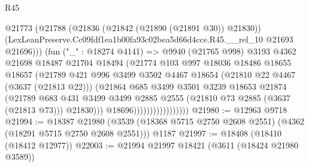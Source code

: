 \begin{lexlean}{R45}
\begin{coremodule}
                                  @21773
                                    (@21788
                                      (@21836 (@21842 (@21890 (@21891 @30)) @21830))
                                      (LexLeanPreserve.Cc09fdf1ea1b00fa93c02bea5d66d4cce.R45.__rel_10
                                        @21693
                                        @21696)))
                                  (fun ("_" : @18274 @4141) =>
                                  @9940
                                    (@21765 @998)
                                    @3193
                                    @4362
                                    @21698
                                    @18487
                                    @21704
                                    @18494
                                    (@21774
                                      @103
                                      @997
                                      @18036
                                      @18486
                                      @18655
                                      @18657
                                      (@21789
                                        @421
                                        @996
                                        @3499
                                        @3502
                                        @4467
                                        @18654
                                        (@21810 @22 @4467 (@3637 (@21813 @22)))
                                        (@21864
                                          @685
                                          @3499
                                          @3501
                                          @3239
                                          @18653
                                          @21874
                                          (@21789
                                            @683
                                            @431
                                            @3499
                                            @3499
                                            @2885
                                            @2555
                                            (@21810 @73 @2885 (@3637 (@21813 @73)))
                                            @21830)))
                                      @18696)))))))))))))))))
@21980 := @12963 @9718
@21994 := @18387
    @21980
    (@3539 (@18368 @5715 @2750 @2608 @2551) (@4362 (@18291 @5715 @2750 @2608 @2551)))
    @1187
@21997 := @18408 (@18410 (@18412 @12977))
@22003 := @21994 @21997 @18421 (@3611 (@18424 @21980 @3589))

\end{coremodule}
\end{lexlean}
